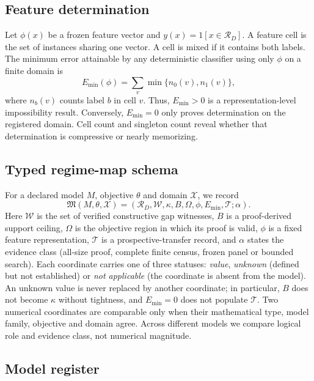 \subsection{Feature determination}

Let $\phi(x)$ be a frozen feature vector and $y(x)=1[x\in\mathcal{R}_D]$.  A feature cell is the set of instances sharing one vector.  A cell is mixed if it contains both labels.  The minimum error attainable by any deterministic classifier using only $\phi$ on a finite domain is
\begin{equation}
 E_{\min}(\phi)=\sum_v \min\{n_0(v),n_1(v)\},
\end{equation}
where $n_b(v)$ counts label $b$ in cell $v$.  Thus, $E_{\min}>0$ is a representation-level impossibility result.  Conversely, $E_{\min}=0$ only proves determination on the registered domain.  Cell count and singleton count reveal whether that determination is compressive or nearly memorizing.

\subsection{Typed regime-map schema}

For a declared model $M$, objective $\theta$ and domain $\mathcal X$, we record
\begin{equation}
 \mathfrak M(M,\theta,\mathcal X)=
 (\mathcal R_D,\mathcal W,\kappa,B,\Omega,\phi,E_{\min},\mathcal T;\alpha).
 \label{eq:typed-map}
\end{equation}
Here $\mathcal W$ is the set of verified constructive gap witnesses, $B$ is a proof-derived support ceiling, $\Omega$ is the objective region in which its proof is valid, $\phi$ is a fixed feature representation, $\mathcal T$ is a prospective-transfer record, and $\alpha$ states the evidence class (all-size proof, complete finite census, frozen panel or bounded search).  Each coordinate carries one of three statuses: \emph{value}, \emph{unknown} (defined but not established) or \emph{not applicable} (the coordinate is absent from the model).  An unknown value is never replaced by another coordinate; in particular, $B$ does not become $\kappa$ without tightness, and $E_{\min}=0$ does not populate $\mathcal T$.  Two numerical coordinates are comparable only when their mathematical type, model family, objective and domain agree.  Across different models we compare logical role and evidence class, not numerical magnitude.

\subsection{Model register}

